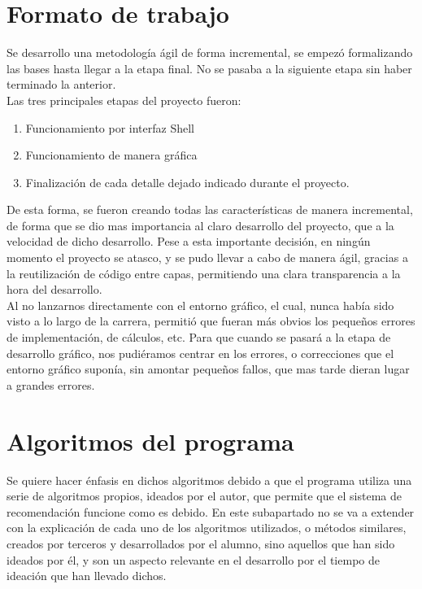 \section{Formato de trabajo}
Se desarrollo una metodología ágil de forma incremental, se empezó formalizando las bases hasta llegar a la etapa final. No se pasaba a la siguiente etapa sin haber terminado la anterior.\\
Las tres principales etapas del proyecto fueron:
\begin{enumerate}
\item	Funcionamiento por interfaz Shell
\item	Funcionamiento de manera gráfica
\item	Finalización de cada detalle dejado indicado durante el proyecto.
\end{enumerate}

De esta forma, se fueron creando todas las características de manera incremental, de forma que se dio mas importancia al claro desarrollo del proyecto, que a la velocidad de dicho desarrollo. Pese a esta importante decisión, en ningún momento el proyecto se atasco, y se pudo llevar a cabo de manera ágil, gracias a la reutilización de código entre capas, permitiendo una clara transparencia a la hora del desarrollo.\\
Al no lanzarnos directamente con el entorno gráfico, el cual, nunca había sido visto a lo largo de la carrera, permitió que fueran más obvios los pequeños errores de implementación, de cálculos, etc. Para que cuando se pasará a la etapa de desarrollo gráfico, nos pudiéramos centrar en los errores, o correcciones que el entorno gráfico suponía, sin amontar pequeños fallos, que mas tarde dieran lugar a grandes errores.\\

\section{Algoritmos del programa}
Se quiere hacer énfasis en dichos algoritmos debido a que el programa utiliza una serie de algoritmos propios, ideados por el autor, que permite que el sistema de recomendación funcione como es debido. En este subapartado no se va a extender con la explicación de cada uno de los algoritmos utilizados, o métodos similares, creados por terceros y desarrollados por el alumno, sino aquellos que han sido ideados por él, y son un aspecto relevante en el desarrollo por el tiempo de ideación que han llevado dichos.

